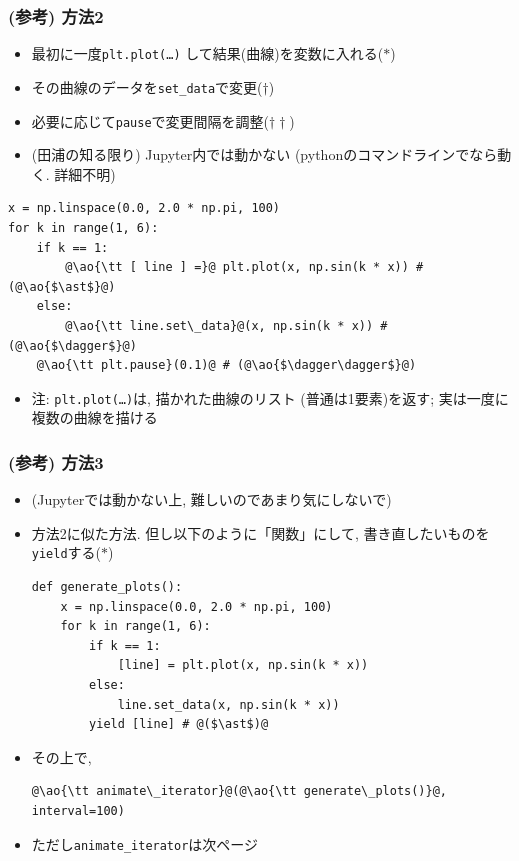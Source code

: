 \documentclass[10pt,dvipdfmx]{beamer}
\newcommand{\ao}[1]{{\color{blue}#1}}
\begin{document}
\begin{frame}[fragile]
  \frametitle{(参考) 方法2}
  \begin{itemize}
  \item 最初に一度{\tt plt.plot(\ldots)}
    して結果(曲線)を変数に入れる(\ao{$\ast$})
  \item その曲線のデータを{\tt set\_data}で変更(\ao{$\dagger$})
  \item 必要に応じて{\tt pause}で変更間隔を調整(\ao{$\dagger\dagger$})
  \item (田浦の知る限り) Jupyter内では動かない
    (pythonのコマンドラインでなら動く. 詳細不明)
  \end{itemize}
\begin{center}
\begin{lstlisting}
x = np.linspace(0.0, 2.0 * np.pi, 100)
for k in range(1, 6):
    if k == 1:
        @\ao{\tt [ line ] =}@ plt.plot(x, np.sin(k * x)) # (@\ao{$\ast$}@)
    else:
        @\ao{\tt line.set\_data}@(x, np.sin(k * x)) # (@\ao{$\dagger$}@)
    @\ao{\tt plt.pause}(0.1)@ # (@\ao{$\dagger\dagger$}@)
\end{lstlisting}
\end{center}

\begin{itemize}
\item 注: {\tt plt.plot(\ldots)}は, 描かれた曲線のリスト
  (普通は1要素)を返す; 実は一度に複数の曲線を描ける
\end{itemize}
\end{frame}

\begin{frame}[fragile]
  \frametitle{(参考) 方法3}
  \begin{itemize}
  \item (Jupyterでは動かない上, 難しいのであまり気にしないで)
  \item 方法2に似た方法. 但し以下のように「関数」にして,
    書き直したいものを{\tt yield}する($\ast$)
\begin{lstlisting}
def generate_plots():
    x = np.linspace(0.0, 2.0 * np.pi, 100)
    for k in range(1, 6):
        if k == 1:
            [line] = plt.plot(x, np.sin(k * x))
        else:
            line.set_data(x, np.sin(k * x))
        yield [line] # @($\ast$)@
\end{lstlisting}
\item その上で,
\begin{lstlisting}
@\ao{\tt animate\_iterator}@(@\ao{\tt generate\_plots()}@, interval=100)    
\end{lstlisting}
\item ただし{\tt animate\_iterator}は次ページ
\end{itemize}
\end{frame}
\end{document}

